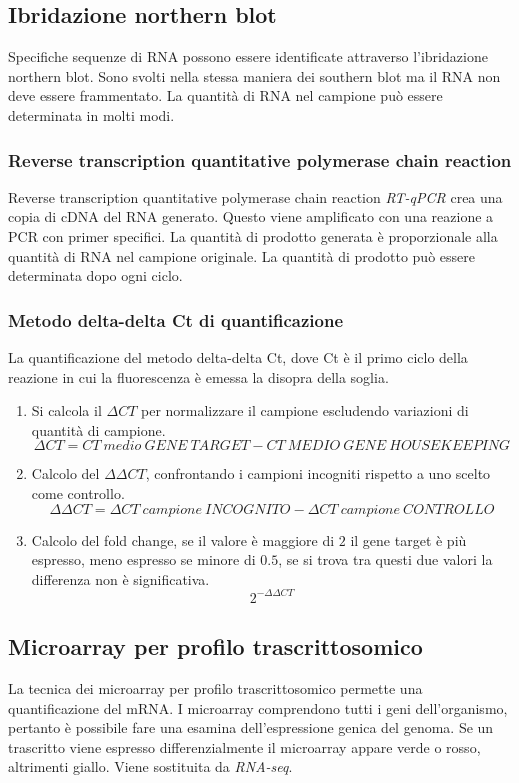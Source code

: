 	\subsection{Ibridazione northern blot}
	Specifiche sequenze di RNA possono essere identificate attraverso l'ibridazione northern blot.
	Sono svolti nella stessa maniera dei southern blot ma il RNA non deve essere frammentato.
	La quantit\`a di RNA nel campione pu\`o essere determinata in molti modi.

		\subsubsection{Reverse transcription quantitative polymerase chain reaction}
		Reverse transcription quantitative polymerase chain reaction \emph{RT-qPCR} crea una copia di cDNA del RNA generato.
		Questo viene amplificato con una reazione a PCR con primer specifici.
		La quantit\`a di prodotto generata \`e proporzionale alla quantit\`a di RNA nel campione originale.
		La quantit\`a di prodotto pu\`o essere determinata dopo ogni ciclo.

		\subsubsection{Metodo delta-delta Ct di quantificazione}
		La quantificazione del metodo delta-delta Ct, dove Ct \`e il primo ciclo della reazione in cui la fluorescenza \`e emessa la disopra della soglia.
		\begin{enumerate}
			\item Si calcola il \emph{$\Delta CT$} per normalizzare il campione escludendo variazioni di quantit\`a di campione.
				\[\Delta CT = CT\ medio\ GENE\ TARGET - CT\ MEDIO\ GENE\ HOUSEKEEPING\]
			\item Calcolo del $\Delta\Delta CT$, confrontando i campioni incogniti rispetto a uno scelto come controllo.
				\[\Delta\Delta CT = \Delta CT\ campione\ INCOGNITO - \Delta CT\ campione\ CONTROLLO\]
			\item Calcolo del fold change, se il valore \`e maggiore di $2$ il gene target \`e pi\`u espresso, meno espresso se minore di $0.5$, se si trova tra questi due valori la differenza non \`e significativa.
				\[2^{-\Delta\Delta CT}\]
		\end{enumerate}

	\subsection{Microarray per profilo trascrittosomico}
	La tecnica dei microarray per profilo trascrittosomico permette una quantificazione del mRNA.
	I microarray comprendono tutti i geni dell'organismo, pertanto \`e possibile fare una esamina dell'espressione genica del genoma.
	Se un trascritto viene espresso differenzialmente il microarray appare verde o rosso, altrimenti giallo.
	Viene sostituita da \emph{RNA-seq}.

